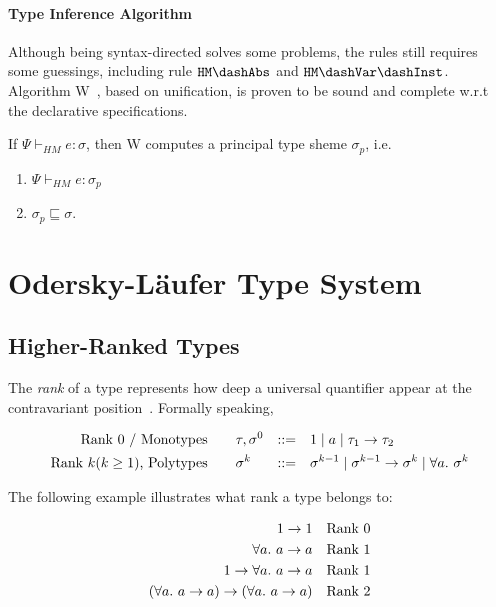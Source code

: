 \paragraph{Type Inference Algorithm}
Although being syntax-directed solves some problems, the rules still requires some guessings,
including rule $\mathtt{HM \dash Abs}$ and $\mathtt{HM \dash Var \dash Inst}$.
Algorithm W~\cite{milner1978theory}, based on unification,
is proven to be sound and complete w.r.t the declarative specifications.

\begin{theorem}
    If $\Psi \vdash_{HM} e : \sigma$, then W computes a principal type sheme $\sigma_p$, i.e.
    \begin{enumerate}
        \item $\Psi \vdash_{HM} e : \sigma_p$
        \item $\sigma_p \sqsubseteq \sigma$.
    \end{enumerate}
\end{theorem}

\section{Odersky-L\"aufer Type System}


\subsection{Higher-Ranked Types}

The \emph{rank} of a type represents how deep a universal quantifier
appear at the contravariant position~\cite{rank1992kfoury}. Formally speaking,

\begin{gather*}
    \begin{aligned}
        \text{Rank 0 / Monotypes}\qquad& \tau, \sigma^0 &::=&\quad 1 \mid a \mid \tau_1\to \tau_2\\
        \text{Rank $k (k \ge 1)$, Polytypes}\qquad& \sigma^k &::=&\quad
            \sigma^{k-1} \mid \sigma^{k-1} \to \sigma^k \mid \all \sigma^k\\
    \end{aligned}
\end{gather*}

The following example illustrates what rank a type belongs to:

\begin{gather*}
    \begin{aligned}
        1 \to 1 && \text{Rank 0}\\
        \all a \to a && \text{Rank 1}\\
        1 \to \all a \to a && \text{Rank 1}\\
        (\all a \to a) \to (\all a \to a) && \text{Rank 2}\\
    \end{aligned}
\end{gather*}

